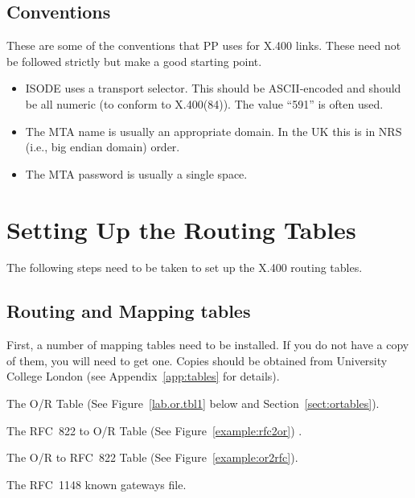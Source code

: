 


\subsection{Conventions}
These are some of the conventions that PP uses for X.400 links. These
need not be followed strictly but make a good starting point.

\begin{itemize}
\item ISODE uses a transport selector. This should be ASCII-encoded
and should be all numeric (to conform to X.400(84)). The value ``591''
is often used.

\item The MTA name is usually an appropriate domain. In the UK this 
is in NRS (i.e., big endian domain) order.

\item The MTA password is usually a single space.
\end{itemize}

\section {Setting Up the Routing Tables}

The following steps need to be taken to set up the X.400 routing
tables.  

\subsection{Routing and Mapping tables}
First, a number of mapping tables need to be installed. If
you do not have a copy of them, you will need to get one. Copies should be
obtained from University College London (see Appendix~\ref{app:tables}
for details).

\begin{describe}
\item[\verb|or|:] The O/R Table (See Figure~\ref{lab.or.tbl1} below and
Section~\ref{sect:ortables}). 
\item[\verb|rfc2or|:] The RFC~822 to O/R Table (See
Figure~\ref{example:rfc2or}) .
\item[\verb|or2rfc|:] The O/R to RFC~822 Table (See
Figure~\ref{example:or2rfc}).
\item[\verb|rfc1148gate|:] The RFC~1148 known gateways file.
\end{describe}


